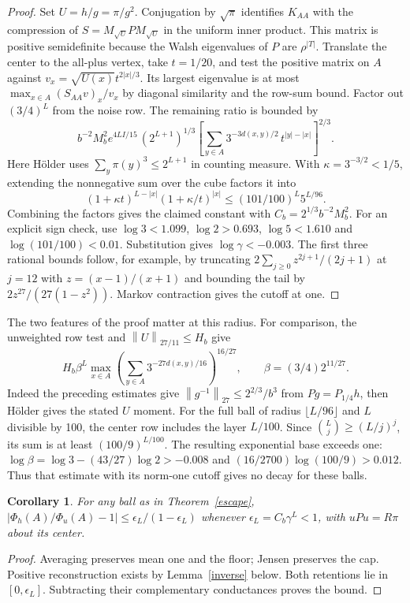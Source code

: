 \documentclass[11pt]{article}
\newtheorem{corollary}[theorem]{Corollary}
\newcommand{\norm}[1]{\left\lVert#1\right\rVert}
\begin{document}
\begin{proof}
Set $U=h/g=\pi/g^2$. Conjugation by $\sqrt{\pi}$ identifies $K_{AA}$ with the compression of $S=M_{\sqrt U}P M_{\sqrt U}$ in the uniform inner product. This matrix is positive semidefinite because the Walsh eigenvalues of $P$ are $\rho^{|T|}$. Translate the center to the all-plus vertex, take $t=1/20$, and test the positive matrix on $A$ against $v_x=\sqrt{U(x)}t^{2|x|/3}$. Its largest eigenvalue is at most $\max_{x\in A}(S_{AA}v)_x/v_x$ by diagonal similarity and the row-sum bound. Factor out $(3/4)^L$ from the noise row. The remaining ratio is bounded by
\[
 b^{-2}M_b^2 e^{4LI/15}\,(2^{L+1})^{1/3}
 \left[\sum_{y\in A}3^{-3d(x,y)/2}\,t^{|y|-|x|}\right]^{2/3}.
\]
Here H\"older uses $\sum_y\pi(y)^3\le 2^{L+1}$ in counting measure. With $\kappa=3^{-3/2}<1/5$, extending the nonnegative sum over the cube factors it into
\[
 (1+\kappa t)^{L-|x|}(1+\kappa/t)^{|x|}
 \le (101/100)^L 5^{L/96}.
\]
Combining the factors gives the claimed constant with $C_b=2^{1/3}b^{-2}M_b^2$. For an explicit sign check, use $\log3<1.099$, $\log2>0.693$, $\log5<1.610$ and $\log(101/100)<0.01$. Substitution gives $\log\gamma<-0.003$. The first three rational bounds follow, for example, by truncating $2\sum_{j\ge0}z^{2j+1}/(2j+1)$ at $j=12$ with $z=(x-1)/(x+1)$ and bounding the tail by $2z^{27}/(27(1-z^2))$. Markov contraction gives the cutoff at one.
\end{proof}

The two features of the proof matter at this radius. For comparison, the unweighted row test and $\norm U_{27/11}\le H_b$ give
\[
 H_b\beta^L\max_{x\in A}\left(\sum_{y\in A}3^{-27d(x,y)/16}\right)^{16/27},
 \qquad \beta=(3/4)2^{11/27}.
\]
Indeed the preceding estimates give $\norm{g^{-1}}_{27}\le 2^{2/3}/b^3$ from $Pg=P_{1/4}h$, then H\"older gives the stated $U$ moment. For the full ball of radius $\lfloor L/96\rfloor$ and $L$ divisible by 100, the center row includes the layer $L/100$. Since $\binom{L}{j}\ge(L/j)^j$, its sum is at least $(100/9)^{L/100}$. The resulting exponential base exceeds one: $\log\beta=\log3-(43/27)\log2>-0.008$ and $(16/2700)\log(100/9)>0.012$. Thus that estimate with its norm-one cutoff gives no decay for these balls.

\begin{corollary}\label{comparison}
For any ball as in Theorem~\ref{escape}, $\left|\Phi_h(A)/\Phi_u(A)-1\right|\le \epsilon_L/(1-\epsilon_L)$ whenever $\epsilon_L=C_b\gamma^L<1$, with $uPu=R\pi$ about its center.
\end{corollary}
\begin{proof}
Averaging preserves mean one and the floor; Jensen preserves the cap. Positive reconstruction exists by Lemma~\ref{inverse} below. Both retentions lie in $[0,\epsilon_L]$. Subtracting their complementary conductances proves the bound.
\end{proof}
\end{document}
